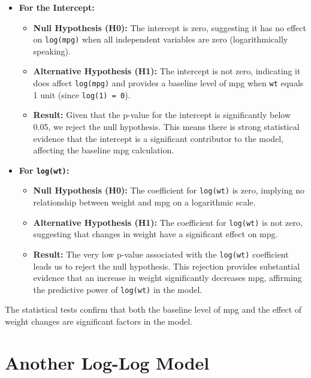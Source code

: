 \documentclass[
  letterpaper,
  DIV=11,
  numbers=noendperiod]{scrreport}
\providecommand{\tightlist}{%
  \setlength{\itemsep}{0pt}\setlength{\parskip}{0pt}}\usepackage{longtable,booktabs,array}
\begin{document}
\begin{itemize}
\tightlist
\item
  \textbf{For the Intercept:}

  \begin{itemize}
  \tightlist
  \item
    \textbf{Null Hypothesis (H0):} The intercept is zero, suggesting it
    has no effect on \texttt{log(mpg)} when all independent variables
    are zero (logarithmically speaking).
  \item
    \textbf{Alternative Hypothesis (H1):} The intercept is not zero,
    indicating it does affect \texttt{log(mpg)} and provides a baseline
    level of mpg when \texttt{wt} equals 1 unit (since
    \texttt{log(1)\ =\ 0}).
  \item
    \textbf{Result:} Given that the p-value for the intercept is
    significantly below 0.05, we reject the null hypothesis. This means
    there is strong statistical evidence that the intercept is a
    significant contributor to the model, affecting the baseline mpg
    calculation.
  \end{itemize}
\item
  \textbf{For \texttt{log(wt)}:}

  \begin{itemize}
  \tightlist
  \item
    \textbf{Null Hypothesis (H0):} The coefficient for \texttt{log(wt)}
    is zero, implying no relationship between weight and mpg on a
    logarithmic scale.
  \item
    \textbf{Alternative Hypothesis (H1):} The coefficient for
    \texttt{log(wt)} is not zero, suggesting that changes in weight have
    a significant effect on mpg.
  \item
    \textbf{Result:} The very low p-value associated with the
    \texttt{log(wt)} coefficient leads us to reject the null hypothesis.
    This rejection provides substantial evidence that an increase in
    weight significantly decreases mpg, affirming the predictive power
    of \texttt{log(wt)} in the model.
  \end{itemize}
\end{itemize}

The statistical tests confirm that both the baseline level of mpg and
the effect of weight changes are significant factors in the model.

\section{Another Log-Log Model}\label{another-log-log-model}
\end{document}
